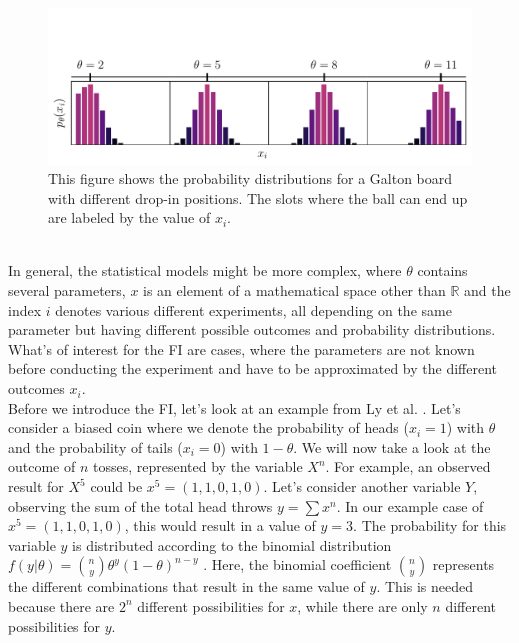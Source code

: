 \begin{figure}
	\centering
	\includegraphics[width = \textwidth, clip, trim= 0cm 0cm 0cm 2.3cm]{text/FisherInformation/plots/GaltonDistributionsPlot.pdf}
	\caption{This figure shows the probability distributions for a Galton board with different drop-in positions. The slots where the ball can end up are labeled by the value of $x_i$.}
	\label{fig:GaltonDistributions}
\end{figure}\\
In general, the statistical models might be more complex, where $\theta$ contains several parameters, $x$ is an element of a mathematical space other than $\mathbb{R}$ and the index $i$ denotes various different experiments, all depending on the same parameter but having different possible outcomes and probability distributions.\\
What's of interest for the FI are cases, where the parameters are not known before conducting the experiment and have to be approximated by the different outcomes $x_i$.\\
Before we introduce the FI, let's look at an example from Ly et al. \cite{StatisticFisherInfoTutorial}. Let's consider a biased coin where we denote the probability of heads ($x_i = 1$) with $\theta$ and the probability of tails ($x_i = 0$) with $1-\theta$. We will now take a look at the outcome of $n$ tosses, represented by the variable $X^n$. For example, an observed result for $X^5$ could be $x^5 = (1,1,0,1,0)$. Let's consider another variable $Y$, observing the sum of the total head throws $y = \sum x^n$. In our example case of $x^5 = (1,1,0,1,0)$, this would result in a value of $y = 3$. The probability for this variable $y$ is distributed according to the binomial distribution $f(y|\theta) = \binom{n}{y}\theta^y (1-\theta)^{n-y}$ \cite{BookOnBinomialDistributions}. Here, the binomial coefficient $\binom{n}{y}$ represents the different combinations that result in the same value of $y$. This is needed because there are $2^n$ different possibilities for $x$, while there are only $n$ different possibilities for $y$.\\

